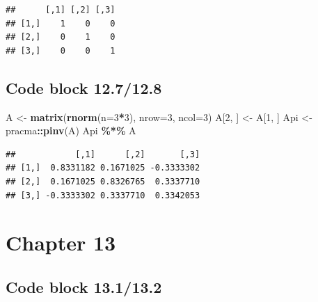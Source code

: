 \documentclass[
]{book}
\newenvironment{Shaded}{\begin{snugshade}}{\end{snugshade}}
\newcommand{\DataTypeTok}[1]{\textcolor[rgb]{0.13,0.29,0.53}{#1}}
\newcommand{\DecValTok}[1]{\textcolor[rgb]{0.00,0.00,0.81}{#1}}
\newcommand{\FloatTok}[1]{\textcolor[rgb]{0.00,0.00,0.81}{#1}}
\newcommand{\KeywordTok}[1]{\textcolor[rgb]{0.13,0.29,0.53}{\textbf{#1}}}
\newcommand{\NormalTok}[1]{#1}
\newcommand{\OperatorTok}[1]{\textcolor[rgb]{0.81,0.36,0.00}{\textbf{#1}}}
\newcommand{\OtherTok}[1]{\textcolor[rgb]{0.56,0.35,0.01}{#1}}
\newcommand{\StringTok}[1]{\textcolor[rgb]{0.31,0.60,0.02}{#1}}
\begin{document}
\begin{verbatim}
##      [,1] [,2] [,3]
## [1,]    1    0    0
## [2,]    0    1    0
## [3,]    0    0    1
\end{verbatim}

\hypertarget{code-block-12.712.8}{%
\subsection*{Code block 12.7/12.8}\label{code-block-12.712.8}}

\begin{Shaded}
\begin{Highlighting}[]
\NormalTok{A \textless{}{-}}\StringTok{ }\KeywordTok{matrix}\NormalTok{(}\KeywordTok{rnorm}\NormalTok{(}\DataTypeTok{n=}\DecValTok{3}\OperatorTok{*}\DecValTok{3}\NormalTok{), }\DataTypeTok{nrow=}\DecValTok{3}\NormalTok{, }\DataTypeTok{ncol=}\DecValTok{3}\NormalTok{)}
\NormalTok{A[}\DecValTok{2}\NormalTok{, ] \textless{}{-}}\StringTok{ }\NormalTok{A[}\DecValTok{1}\NormalTok{, ]}
\NormalTok{Api \textless{}{-}}\StringTok{ }\NormalTok{pracma}\OperatorTok{::}\KeywordTok{pinv}\NormalTok{(A)}
\NormalTok{Api }\OperatorTok{\%*\%}\StringTok{ }\NormalTok{A}
\end{Highlighting}
\end{Shaded}

\begin{verbatim}
##            [,1]      [,2]       [,3]
## [1,]  0.8331182 0.1671025 -0.3333302
## [2,]  0.1671025 0.8326765  0.3337710
## [3,] -0.3333302 0.3337710  0.3342053
\end{verbatim}

\hypertarget{chapter-13}{%
\section*{Chapter 13}\label{chapter-13}}

\hypertarget{code-block-13.113.2}{%
\subsection*{Code block 13.1/13.2}\label{code-block-13.113.2}}

\begin{Shaded}
\end{Shaded}
\end{document}

